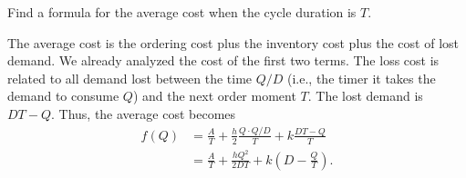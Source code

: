\begin{exercise} Find a formula for the average cost when the cycle duration is $T$.
  \begin{solution}
The average cost is the ordering cost plus the inventory cost plus the
cost of lost demand. We already analyzed the cost of the first two
terms. The loss cost is related to all demand lost between the time
$Q/D$ (i.e., the timer it takes the demand to consume $Q$) and the
next order moment $T$. The lost demand is
$DT-Q$. Thus, the average cost becomes
\begin{align*}
  f(Q) 
&= \frac A T + \frac h2 \frac{Q\cdot Q/D}{T}+k \frac{DT-Q}T \\
&= \frac A T + \frac{hQ^2}{2DT}+k \left(D-\frac Q T\right). 
\end{align*}
\end{solution}
\end{exercise}

